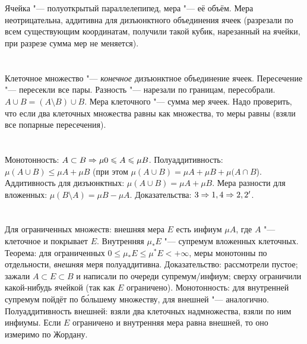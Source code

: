 \section{} %
Ячейка "--- полуоткрытый параллелепипед, мера "--- её объём.
Мера неотрицательна, аддитивна для дизъюнктного объединения ячеек (разрезали по всем существующим координатам, получили такой кубик, нарезанный на ячейки, при разрезе сумма мер не меняется).

\section{} %
Клеточное множество "--- \textit{конечное} дизъюнктное объединение ячеек.
Пересечение "--- пересекли все пары.
Разность "--- нарезали по границам, пересобрали.
$A \cup B = (A \setminus B) \cup B$.
Мера клеточного "--- сумма мер ячеек.
Надо проверить, что если два клеточных множества равны как множества, то меры равны (взяли все попарные пересечения).

\section{} %
Монотонность: $A \subset B \Rightarrow \mu 0 \leqslant A \leqslant \mu B$.
Полуаддитивность: $\mu(A\cup B) \le \mu A + \mu B$ (при этом $\mu(A \cup B) = \mu A + \mu B + \mu (A \cap B$).
Аддитивность для дизъюнктных: $\mu(A \cup B) = \mu A + \mu B$.
Мера разности для вложенных: $\mu(B \setminus A) = \mu B - \mu A$.
Доказательства: $3 \Rightarrow 1, 4 \Rightarrow 2, 2'$.

\section{} %
Для ограниченных множеств: внешняя мера $E$ есть инфиум $\mu A$, где $A$ "--- клеточное и покрывает $E$.
Внутренняя $\mu_* E$ "--- супремум вложенных клеточных.
Теорема: для ограниченных $0 \le \mu_* E \le \mu^* E < +\infty$, меры монотонны по отдельности, \textit{внешняя} меря полуаддитивна.
Доказательство: рассмотрели пустое; зажали $A \subset E \subset B$ и написали по очереди супремум/инфиум; сверху ограничили какой-нибудь ячейкой (так как $E$ ограничено).
Монотонность: для внутренней супремум пойдёт по б\'ольшему множеству, для внешней "--- аналогично.
Полуаддитивность внешней: взяли два клеточных надмножества, взяли по ним инфиумы.
Если $E$ ограничено и внутренняя мера равна внешней, то оно измеримо по Жордану.

